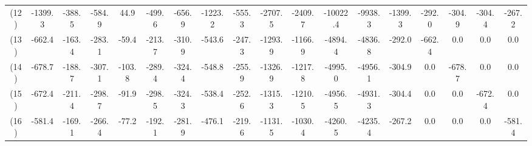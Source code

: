 \begin{tabular}{cccccccccccccccccc}
(12) & -1399.3 & -388.5 & -584.9 & 44.9 & -499.6 & -656.9 & -1223.2 & -555.3 & -2707.5 & -2409.7 & -10022.4 & -9938.3 & -1399.3 & -292.0 & -304.9 & -304.4 & -267.2 \\
(13) & -662.4 & -163.4 & -283.1 & -59.4 & -213.7 & -310.9 & -543.6 & -247.3 & -1293.9 & -1166.9 & -4894.4 & -4836.8 & -292.0 & -662.4 & 0.0 & 0.0 & 0.0 \\
(14) & -678.7 & -188.7 & -307.1 & -103.8 & -289.4 & -324.4 & -548.8 & -255.9 & -1326.9 & -1217.8 & -4995.0 & -4956.1 & -304.9 & 0.0 & -678.7 & 0.0 & 0.0 \\
(15) & -672.4 & -211.4 & -298.7 & -91.9 & -298.5 & -324.3 & -538.4 & -252.6 & -1315.3 & -1210.5 & -4956.5 & -4931.3 & -304.4 & 0.0 & 0.0 & -672.4 & 0.0 \\
(16) & -581.4 & -169.1 & -266.4 & -77.2 & -192.1 & -281.9 & -476.1 & -219.6 & -1131.5 & -1030.4 & -4260.5 & -4235.4 & -267.2 & 0.0 & 0.0 & 0.0 & -581.4 \\
\end{tabular}
